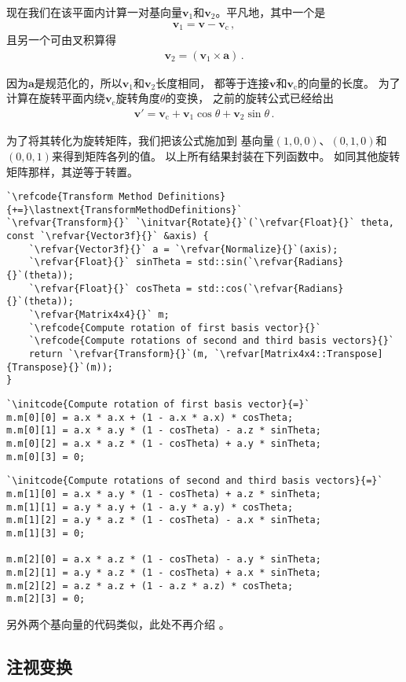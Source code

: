 现在我们在该平面内计算一对基向量$\bm v_1$和$\bm v_2$。平凡地，其中一个是
\begin{align*}
    \bm v_1=\bm v-\bm v_\mathrm{c}\, ,
\end{align*}
且另一个可由叉积算得
\begin{align*}
    \bm v_2=(\bm v_1\times\bm a)\, .
\end{align*}

因为$\bm a$是规范化的，所以$\bm v_1$和$\bm v_2$长度相同，
都等于连接$\bm v$和$\bm v_\mathrm{c}$的向量的长度。
为了计算在旋转平面内绕$\bm v_\mathrm{c}$旋转角度$\theta$的变换，
之前的旋转公式已经给出
\begin{align*}
    \bm v'=\bm v_\mathrm{c}+\bm v_1\cos\theta+\bm v_2\sin\theta\, .
\end{align*}

为了将其转化为旋转矩阵，我们把该公式施加到
基向量$(1,0,0)$、$(0,1,0)$和$(0,0,1)$来得到矩阵各列的值。
以上所有结果封装在下列函数中。
如同其他旋转矩阵那样，其逆等于转置。
\begin{lstlisting}
`\refcode{Transform Method Definitions}{+=}\lastnext{TransformMethodDefinitions}`
`\refvar{Transform}{}` `\initvar{Rotate}{}`(`\refvar{Float}{}` theta, const `\refvar{Vector3f}{}` &axis) {
    `\refvar{Vector3f}{}` a = `\refvar{Normalize}{}`(axis);
    `\refvar{Float}{}` sinTheta = std::sin(`\refvar{Radians}{}`(theta));
    `\refvar{Float}{}` cosTheta = std::cos(`\refvar{Radians}{}`(theta));
    `\refvar{Matrix4x4}{}` m;
    `\refcode{Compute rotation of first basis vector}{}`
    `\refcode{Compute rotations of second and third basis vectors}{}`
    return `\refvar{Transform}{}`(m, `\refvar[Matrix4x4::Transpose]{Transpose}{}`(m));
}
\end{lstlisting}

\begin{lstlisting}
`\initcode{Compute rotation of first basis vector}{=}`
m.m[0][0] = a.x * a.x + (1 - a.x * a.x) * cosTheta;
m.m[0][1] = a.x * a.y * (1 - cosTheta) - a.z * sinTheta;
m.m[0][2] = a.x * a.z * (1 - cosTheta) + a.y * sinTheta;
m.m[0][3] = 0;
\end{lstlisting}

\begin{lstlisting}
`\initcode{Compute rotations of second and third basis vectors}{=}`
m.m[1][0] = a.x * a.y * (1 - cosTheta) + a.z * sinTheta;
m.m[1][1] = a.y * a.y + (1 - a.y * a.y) * cosTheta;
m.m[1][2] = a.y * a.z * (1 - cosTheta) - a.x * sinTheta;
m.m[1][3] = 0;

m.m[2][0] = a.x * a.z * (1 - cosTheta) - a.y * sinTheta;
m.m[2][1] = a.y * a.z * (1 - cosTheta) + a.x * sinTheta;
m.m[2][2] = a.z * a.z + (1 - a.z * a.z) * cosTheta;
m.m[2][3] = 0;
\end{lstlisting}

另外两个基向量的代码类似，此处不再介绍
。

\subsection{注视变换}\label{sub:注视变换}
